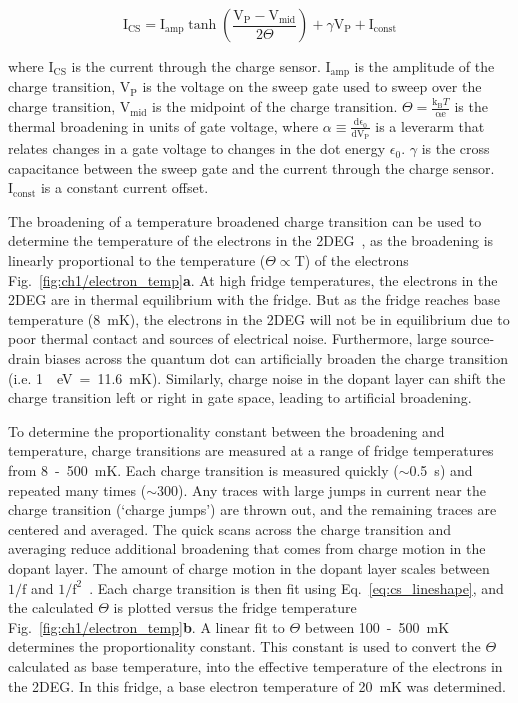\begin{equation}\label{eq:cs_lineshape}
 \mathrm{I_{CS}} = 
 \mathrm{I_{amp}}
 \tanh
 \left( 
 \frac{\mathrm{V_P - V_{mid}}}{2\Theta}
 \right) + 
 \gamma \mathrm{V_P}
 + \mathrm{I_{const}}
\end{equation}

where $\mathrm{I_{CS}}$ is the current through the charge sensor. $\mathrm{I_{amp}}$ is the amplitude of the charge transition, $\mathrm{V_{P}}$ is the voltage on the sweep gate used to sweep over the charge transition, $\mathrm{V_{mid}}$ is the midpoint of the charge transition. $\Theta=\frac{\mathrm{k_B}T}{\mathrm{\alpha e}}$ is the thermal broadening in units of gate voltage, where $\alpha \equiv \frac{\mathrm{d\epsilon_0}}{\mathrm{dV_P}}$ is a leverarm that relates changes in a gate voltage to changes in the dot energy $\epsilon_0$. $\gamma$ is the cross capacitance between the sweep gate and the current through the charge sensor. $\mathrm{I_{const}}$ is a constant current offset.



The broadening of a temperature broadened charge transition can be used to determine the temperature of the electrons in the 2DEG~\cite{cs_measure_temp}, as the broadening is linearly proportional to the temperature ($\Theta\propto\mathrm{T}$) of the electrons Fig.~\ref{fig:ch1/electron_temp}\textbf{a}. At high fridge temperatures, the electrons in the 2DEG are in thermal equilibrium with the fridge. But as the fridge reaches base temperature (\qty{8}{mK}), the electrons in the 2DEG will not be in equilibrium due to poor thermal contact and sources of electrical noise. Furthermore, large source-drain biases across the quantum dot can artificially broaden the charge transition (i.e. \qty{1}{\mu eV}~=~\qty{11.6}{mK}). Similarly, charge noise in the dopant layer can shift the charge transition left or right in gate space, leading to artificial broadening. 


To determine the proportionality constant between the broadening and temperature, charge transitions are measured at a range of fridge temperatures from \qty{8}{}~-~\qty{500}{mK}. Each charge transition is measured quickly ($\sim$\qty{0.5}{s}) and repeated many times ($\sim300$). Any traces with large jumps in current near the charge transition (`charge jumps') are thrown out, and the remaining traces are centered and averaged. The quick scans across the charge transition and averaging reduce additional broadening that comes from charge motion in the dopant layer. The amount of charge motion in the dopant layer scales between $\mathrm{1/f}$ and $\mathrm{1/f^2}$~\cite{charge_noise}. Each charge transition is then fit using Eq.~\ref{eq:cs_lineshape}, and the calculated $\Theta$ is plotted versus the fridge temperature Fig.~\ref{fig:ch1/electron_temp}\textbf{b}. A linear fit to $\Theta$ between \qty{100}{}~-~\qty{500}{mK} determines the proportionality constant. This constant is used to convert the $\Theta$ calculated as base temperature, into the effective temperature of the electrons in the 2DEG. In this fridge, a base electron temperature of \qty{20}{mK} was determined.



